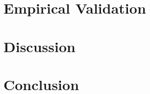 \documentclass[11pt]{article}
\begin{document}
\section{Empirical Validation}

\section{Discussion}

\section{Conclusion}



\end{document}
